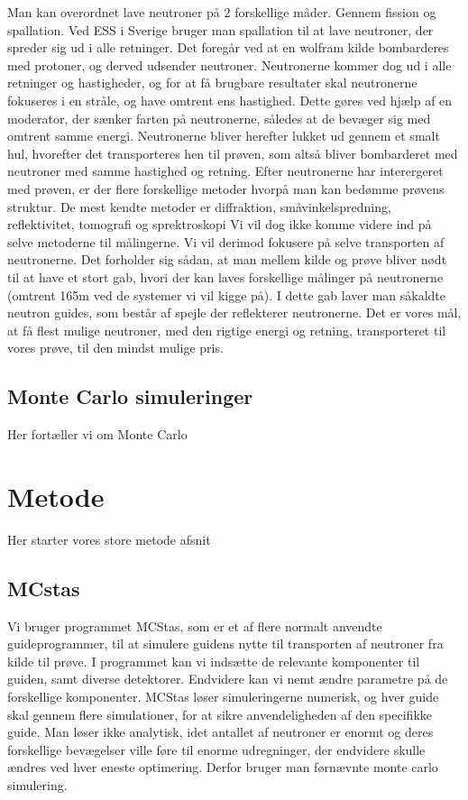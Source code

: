 \documentclass[12pt,oneside,a4paper]{article}
\begin{document}
{{{{{Man kan overordnet lave neutroner på 2 forskellige måder. Gennem fission og spallation. Ved ESS i Sverige bruger man spallation til at lave neutroner, der spreder sig ud i alle retninger. Det foregår ved at en wolfram kilde bombarderes med protoner, og derved udsender neutroner. Neutronerne kommer dog ud i alle retninger og hastigheder, og for at få brugbare resultater skal neutronerne fokuseres i en stråle, og have omtrent ens hastighed. Dette gøres ved hjælp af en moderator, der sænker farten på neutronerne, således at de bevæger sig med omtrent samme energi. Neutronerne bliver herefter lukket ud gennem et smalt hul, hvorefter det transporteres hen til prøven, som altså bliver bombarderet med neutroner med samme hastighed og retning. Efter neutronerne har interergeret med prøven, er der flere forskellige metoder hvorpå man kan bedømme prøvens struktur. De mest kendte metoder er diffraktion, småvinkelspredning, reflektivitet, tomografi og sprektroskopi \cite{ess_folder}
Vi vil dog ikke komme videre ind på selve metoderne til målingerne. Vi vil derimod fokusere på selve transporten af neutronerne. Det forholder sig sådan, at man mellem kilde og prøve bliver nødt til at have et stort gab, hvori der kan laves forskellige målinger på neutronerne (omtrent 165m ved de systemer vi vil kigge på). I dette gab laver man såkaldte neutron guides, som består af spejle der reflekterer neutronerne. Det er vores mål, at få flest mulige neutroner, med den rigtige energi og retning, transporteret til vores prøve, til den mindst mulige pris.


\subsection{Monte Carlo simuleringer}
Her fortæller vi om Monte Carlo 




\section{Metode}
Her starter vores store metode afsnit

\subsection{MCstas}
Vi bruger programmet MCStas, som er et af flere normalt anvendte guideprogrammer, til at simulere guidens nytte til transporten af neutroner fra kilde til prøve. I programmet kan vi indsætte de relevante komponenter til guiden, samt diverse detektorer. Endvidere kan vi nemt ændre parametre på de forskellige komponenter. MCStas løser simuleringerne numerisk, og hver guide skal gennem flere simulationer, for at sikre anvendeligheden af den specifikke guide. Man løser ikke analytisk, idet antallet af neutroner er enormt og deres forskellige bevægelser ville føre til enorme udregninger, der endvidere skulle ændres ved hver eneste optimering. Derfor bruger man førnævnte monte carlo simulering. 

}}}}}
\end{document}
